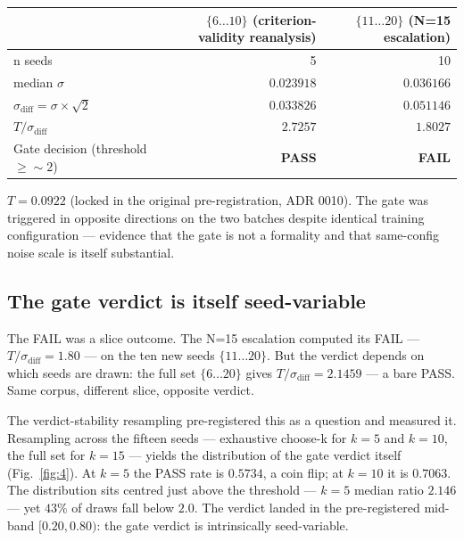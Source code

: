 \documentclass{article}
\begin{document}
\begin{table}[!ht]
\begin{tabular}{@{}lrr@{}}
\toprule
                                    & $\{6 \ldots 10\}$ (criterion-validity reanalysis) & $\{11 \ldots 20\}$ (N=15 escalation) \\
\midrule
n seeds                             & 5             & 10            \\
median $\sigma$                     & $\mathbf{0.023918}$ & $\mathbf{0.036166}$ \\
$\sigma_\mathrm{diff} = \sigma \times \sqrt{2}$ & $0.033826$    & $0.051146$    \\
$T / \sigma_\mathrm{diff}$          & $\mathbf{2.7257}$   & $\mathbf{1.8027}$   \\
Gate decision (threshold $\geq \sim 2$) & \textbf{PASS} & \textbf{FAIL} \\
\bottomrule
\end{tabular}

\vspace{0.5em}

\small $T = 0.0922$ (locked in the original pre-registration, ADR 0010). The gate was triggered in opposite directions on the two batches despite identical training configuration --- evidence that the gate is not a formality and that same-config noise scale is itself substantial.
\end{table}

\subsection{The gate verdict is itself seed-variable}
\label{sec:3.5}

The FAIL was a slice outcome. The N=15 escalation computed its FAIL --- $T/\sigma_\mathrm{diff} = 1.80$ --- on the ten new seeds $\{11 \ldots 20\}$. But the verdict depends on which seeds are drawn: the full set $\{6 \ldots 20\}$ gives $T/\sigma_\mathrm{diff} = 2.1459$ --- a bare PASS. Same corpus, different slice, opposite verdict.

The verdict-stability resampling pre-registered this as a question and measured it. Resampling across the fifteen seeds --- exhaustive choose-k for $k=5$ and $k=10$, the full set for $k=15$ --- yields the distribution of the gate verdict itself (Fig.~\ref{fig:4}). At $k=5$ the PASS rate is $0.5734$, a coin flip; at $k=10$ it is $0.7063$. The distribution sits centred just above the threshold --- $k=5$ median ratio $2.146$ --- yet $43\%$ of draws fall below $2.0$. The verdict landed in the pre-registered mid-band $[0.20, 0.80)$: the gate verdict is intrinsically seed-variable.
\end{document}
